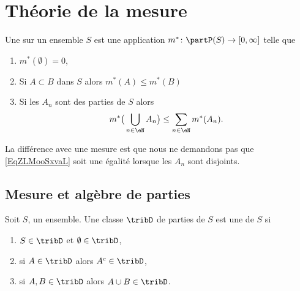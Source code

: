 
\section{Théorie de la mesure}
\label{SecSLOooeMaig}

\begin{definition} \label{DefUMWoolmMaf}
    Une  sur un ensemble \( S\) est une application \( m^*\colon \partP(S)\to \mathopen[ 0 , \infty \mathclose]\) telle que
    \begin{enumerate}
        \item
            \( m^*(\emptyset)=0\),
        \item
            Si \( A\subset B\) dans \( S\) alors \( m^*(A)\leq m^*(B)\)
        \item   \label{ItemARKooppZfDaiii}
            Si les \( A_n\) sont des parties de \( S\) alors
            \begin{equation}    \label{EqZLMooSxvaL}
                m^*\big( \bigcup_{n\in \eN}A_n \big)\leq \sum_{n\in \eN}m^*(A_n).
            \end{equation}
    \end{enumerate}
\end{definition}
La différence avec une mesure est que nous ne demandons pas que \eqref{EqZLMooSxvaL} soit une égalité lorsque les \( A_n\) sont disjoints.

\subsection{Mesure et algèbre de parties}

\begin{definition}   \label{DefTCUoogGDud}
    Soit \( S\), un ensemble. Une classe \( \tribD\) de parties de \( S\) est une  de \( S\) si
    \begin{enumerate}
        \item
            \( S\in\tribD\) et \( \emptyset\in\tribD\),
        \item
            si \( A\in\tribD\) alors \( A^c\in\tribD\),
        \item
            si \( A,B\in\tribD\) alors \( A\cup B\in\tribD\).
    \end{enumerate}
\end{definition}

